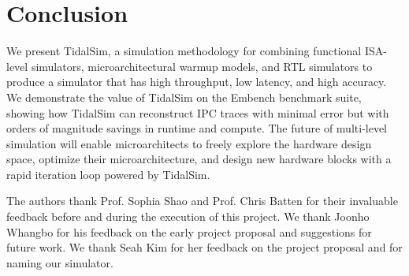 \documentclass[sigplan,nonacm,10pt]{acmart}
\begin{document}
\section{Conclusion}

We present TidalSim, a simulation methodology for combining functional ISA-level simulators, microarchitectural warmup models, and RTL simulators to produce a simulator that has high throughput, low latency, and high accuracy.
We demonstrate the value of TidalSim on the Embench benchmark suite, showing how TidalSim can reconstruct IPC traces with minimal error but with orders of magnitude savings in runtime and compute.
The future of multi-level simulation will enable microarchitects to freely explore the hardware design space, optimize their microarchitecture, and design new hardware blocks with a rapid iteration loop powered by TidalSim.

\begin{acks}
The authors thank Prof. Sophia Shao and Prof. Chris Batten for their invaluable feedback before and during the execution of this project.
We thank Joonho Whangbo for his feedback on the early project proposal and suggestions for future work.
We thank Seah Kim for her feedback on the project proposal and for naming our simulator.
\end{acks}




\end{document}
